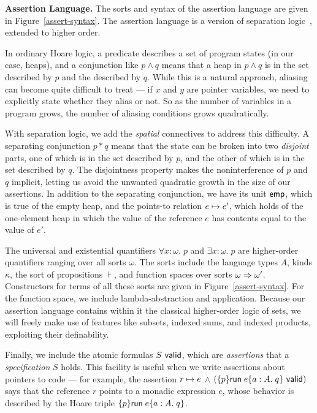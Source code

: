 \documentclass[preprint,natbib]{sigplanconf}
\begin{document}
\textbf{Assertion Language.} The sorts and syntax of the assertion
language are given in Figure~\ref{assert-syntax}. The assertion
language is a version of separation logic~\cite{sep-logic}, extended
to higher order.

In ordinary Hoare logic, a predicate describes a set of program states
(in our case, heaps), and a conjunction like $p \land q$ means that a
heap in $p \land q$ is in the set described by $p$ and the described
by $q$. While this is a natural approach, aliasing can become quite
difficult to treat --- if $x$ and $y$ are pointer variables, we need
to explicitly state whether they alias or not. So as the number of
variables in a program grows, the number of aliasing conditions grows
quadratically.

With separation logic, we add the \emph{spatial} connectives to
address this difficulty. A separating conjunction $p * q$ means that
the state can be broken into two \emph{disjoint} parts, one of which
is in the set described by $p$, and the other of which is in the
set described by $q$. The disjointness property makes the
noninterference of $p$ and $q$ implicit, letting us avoid the unwanted
quadratic growth in the size of our assertions. In addition to the
separating conjunction, we have its unit $\mathsf{emp}$, which is true of the
empty heap, and the points-to relation $e \mapsto e'$, which holds
of the one-element heap in which the value of the reference $e$ has 
contents equal to the value of $e'$. 

The universal and existential quantifiers $\forall x:\omega.\;p$ and
$\exists x:\omega.\;p$ are higher-order quantifiers ranging over all
sorts $\omega$. The sorts include the language types $A$, kinds $\kappa$, the sort of
propositions $\assert$, and function spaces over sorts $\omega \Rightarrow
\omega'$. Constructors for terms of all these sorts are
given in Figure~\ref{assert-syntax}. For the function space, we
include lambda-abstraction and application. Because our assertion
language contains within it the classical higher-order logic of sets,
we will freely make use of features like subsets, indexed sums, and
indexed products, exploiting their definability.

Finally, we include the atomic formulas ${S}\mbox{\textsf{{ valid}}}$, which are
\emph{assertions} that a \emph{specification} $S$ holds. This facility
is useful when we write assertions about pointers to code --- for
example, the assertion $r \mapsto e$ $\land$
$({\{{p}\}{\mbox{\textsf{{run}}}\;{e}}\{{a:A}.\;{q}\}}\mbox{\textsf{{ valid}}})$ says that the reference $r$ points
to a monadic expression $e$, whose behavior is described by the Hoare
triple $\{{p}\}{\mbox{\textsf{{run}}}\;{e}}\{{a:A}.\;{q}\}$.
\end{document}
